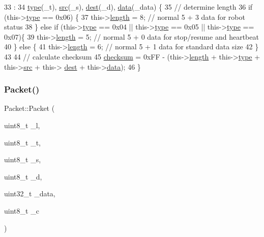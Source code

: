 \begin{DoxyCode}
33                                                                  :
34     \hyperlink{class_packet_a496cc4e5c913eefa002539663d147cfb}{type}(\_t), \hyperlink{class_packet_a7dc8f5be9690e925a11839c3e7869eef}{src}(\_s), \hyperlink{class_packet_a0a6e83b74c425ade443382233ccfc865}{dest}(\_d), \hyperlink{class_packet_a3db8a3abfccbe7a2c2b8f63b4b9fb31e}{data}(\_data) \{
35     \textcolor{comment}{// determine length}
36     \textcolor{keywordflow}{if} (this->\hyperlink{class_packet_a496cc4e5c913eefa002539663d147cfb}{type} == 0x06) \{
37         this->\hyperlink{class_packet_adf5f5bae43f927d2977833232f4b9562}{length} = 8; \textcolor{comment}{// normal 5 + 3 data for robot status}
38     \} \textcolor{keywordflow}{else} \textcolor{keywordflow}{if} (this->\hyperlink{class_packet_a496cc4e5c913eefa002539663d147cfb}{type} == 0x04 || this->\hyperlink{class_packet_a496cc4e5c913eefa002539663d147cfb}{type} == 0x05 || this->\hyperlink{class_packet_a496cc4e5c913eefa002539663d147cfb}{type} == 0x07)\{
39         this->\hyperlink{class_packet_adf5f5bae43f927d2977833232f4b9562}{length} = 5; \textcolor{comment}{// normal 5 + 0 data for stop/resume and heartbeat}
40     \} \textcolor{keywordflow}{else} \{
41         this->\hyperlink{class_packet_adf5f5bae43f927d2977833232f4b9562}{length} = 6; \textcolor{comment}{// normal 5 + 1 data for standard data size}
42     \}
43 
44     \textcolor{comment}{// calculate checksum}
45     \hyperlink{class_packet_a900989fb6f663e8c66faeadb3dc7a318}{checksum} = 0xFF - (this->\hyperlink{class_packet_adf5f5bae43f927d2977833232f4b9562}{length} + this->\hyperlink{class_packet_a496cc4e5c913eefa002539663d147cfb}{type} + this->\hyperlink{class_packet_a7dc8f5be9690e925a11839c3e7869eef}{src} + this->
      \hyperlink{class_packet_a0a6e83b74c425ade443382233ccfc865}{dest} + this->\hyperlink{class_packet_a3db8a3abfccbe7a2c2b8f63b4b9fb31e}{data});
46 \}
\end{DoxyCode}
\mbox{\label{class_packet_a21fe118d2899a0f4109eeb10f4da0f72}} 
\subsubsection{\texorpdfstring{Packet()}{Packet()}\hspace{0.1cm}{\footnotesize\ttfamily [3/3]}}
{\footnotesize\ttfamily Packet\+::\+Packet (\begin{DoxyParamCaption}\item[{uint8\+\_\+t}]{\+\_\+l,  }\item[{uint8\+\_\+t}]{\+\_\+t,  }\item[{uint8\+\_\+t}]{\+\_\+s,  }\item[{uint8\+\_\+t}]{\+\_\+d,  }\item[{uint32\+\_\+t}]{\+\_\+data,  }\item[{uint8\+\_\+t}]{\+\_\+c }\end{DoxyParamCaption})}



